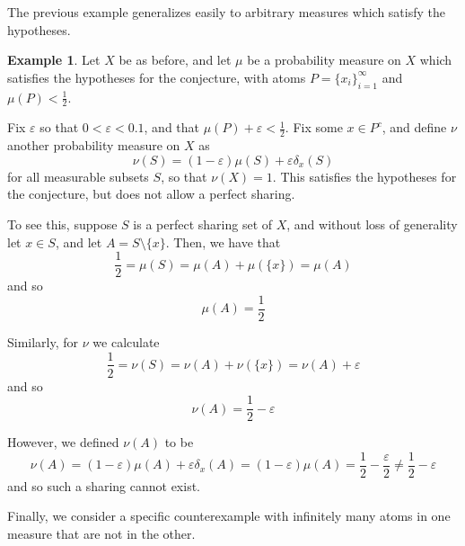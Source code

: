 \documentclass[12pt]{article}
\theoremstyle{definition}
\newtheorem{example}{Example}
\begin{document}
The previous example generalizes easily to arbitrary measures which satisfy the
hypotheses.
\begin{example}
    Let $X$ be as before, and let $\mu$ be a probability measure on $X$ which
    satisfies the hypotheses for the conjecture, with atoms
    $P=\{x_i\}_{i=1}^{\infty}$ and $\mu(P)<\frac{1}{2}$. 
    
    Fix $\varepsilon$ so that $0<\varepsilon<0.1$, and that $\mu(P) + \varepsilon <
    \frac{1}{2}$. Fix some $x\in P^c$, and define $\nu$ another probability
    measure on $X$ as 
    \[
        \nu(S) = (1-\varepsilon)\mu(S) + \varepsilon \delta_x(S)
    \]
    for all measurable subsets $S$,
    so that $\nu(X) = 1$. This satisfies the hypotheses for the conjecture, but
    does not allow a perfect sharing.

    To see this, suppose $S$ is a perfect sharing set of $X$, and without loss
    of generality let $x\in S$, and let $A=S\setminus\{x\}$. Then, we have that
    \[
        \frac{1}{2} = \mu(S) = \mu(A) + \mu(\{x\}) = \mu(A)
    \]
    and so 
    \[
        \mu(A) = \frac{1}{2}
    \]

    Similarly, for $\nu$ we calculate
    \[
        \frac{1}{2} = \nu(S) = \nu(A) + \nu(\{x\}) = \nu(A) + \varepsilon
    \]
    and so
    \[
        \nu(A) = \frac{1}{2} - \varepsilon
    \]

    However, we defined $\nu(A)$ to be
    \[
        \nu(A) = (1-\varepsilon)\mu(A) + \varepsilon\delta_x(A) =
        (1-\varepsilon)\mu(A) = \frac{1}{2} - \frac{\varepsilon}{2}\neq
        \frac{1}{2}-\varepsilon
    \]
    and so such a sharing cannot exist.
\end{example}

Finally, we consider a specific counterexample with infinitely many atoms in one
measure that are not in the other.
\end{document}
